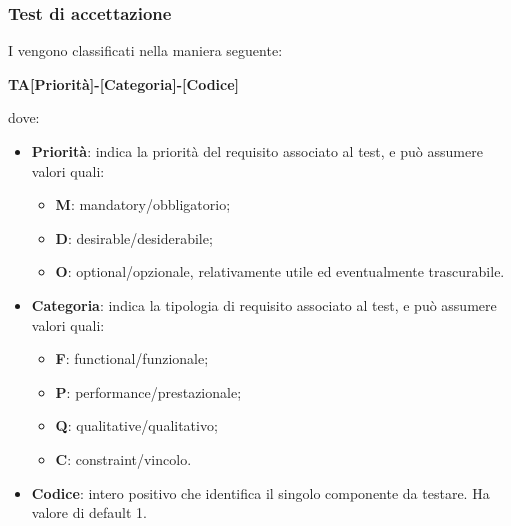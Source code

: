 		\subsubsection{Test di accettazione}
		I  vengono classificati nella maniera seguente:
		\begin{center}
			\textbf{TA[Priorità]-[Categoria]-[Codice]}
		\end{center}		 
		dove:\\
		\begin{itemize}
			\item \textbf{Priorità}: indica la priorità del requisito associato al test, e può assumere valori quali:
			\begin{itemize}
				\item \textbf{M}: mandatory/obbligatorio;
				\item \textbf{D}: desirable/desiderabile;
				\item \textbf{O}: optional/opzionale, relativamente utile ed eventualmente trascurabile.
			\end{itemize}
			\item \textbf{Categoria}: indica la tipologia di requisito associato al test, e può assumere valori quali:
			\begin{itemize}
				\item \textbf{F}: functional/funzionale;
				\item \textbf{P}: performance/prestazionale;
				\item \textbf{Q}: qualitative/qualitativo;
				\item \textbf{C}: constraint/vincolo.
			\end{itemize}
			\item \textbf{Codice}: intero positivo che identifica il singolo componente da testare. Ha valore di default 1.
		\end{itemize}